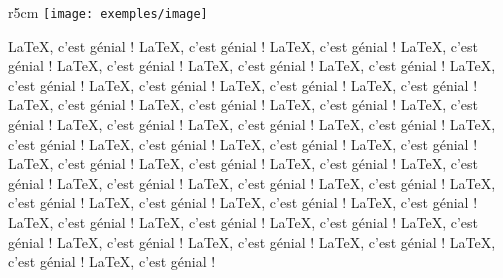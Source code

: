 \begin{wrapfigure}{r}{5cm}
\texttt{[image: exemples/image]}
\end{wrapfigure}
\LaTeX{}, c'est génial ! \LaTeX{}, c'est génial ! \LaTeX{}, c'est génial ! 
\LaTeX{}, c'est génial ! \LaTeX{}, c'est génial ! \LaTeX{}, c'est génial ! 
\LaTeX{}, c'est génial ! \LaTeX{}, c'est génial ! \LaTeX{}, c'est génial ! 
\LaTeX{}, c'est génial ! \LaTeX{}, c'est génial ! \LaTeX{}, c'est génial ! 
\LaTeX{}, c'est génial ! \LaTeX{}, c'est génial ! \LaTeX{}, c'est génial ! 
\LaTeX{}, c'est génial ! \LaTeX{}, c'est génial ! \LaTeX{}, c'est génial ! 
\LaTeX{}, c'est génial ! \LaTeX{}, c'est génial ! \LaTeX{}, c'est génial ! 
\LaTeX{}, c'est génial ! \LaTeX{}, c'est génial ! \LaTeX{}, c'est génial ! 
\LaTeX{}, c'est génial ! \LaTeX{}, c'est génial ! \LaTeX{}, c'est génial ! 
\LaTeX{}, c'est génial ! \LaTeX{}, c'est génial ! \LaTeX{}, c'est génial !
\LaTeX{}, c'est génial ! \LaTeX{}, c'est génial ! \LaTeX{}, c'est génial ! 
\LaTeX{}, c'est génial ! \LaTeX{}, c'est génial ! \LaTeX{}, c'est génial !
\LaTeX{}, c'est génial ! \LaTeX{}, c'est génial ! \LaTeX{}, c'est génial ! 
\LaTeX{}, c'est génial ! \LaTeX{}, c'est génial ! \LaTeX{}, c'est génial !